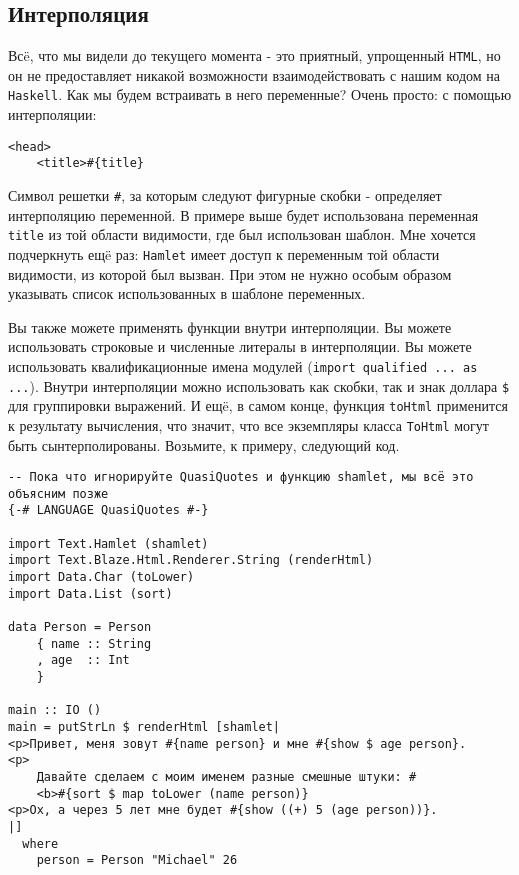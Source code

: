 \subsection{Интерполяция}
Всë, что мы видели до текущего момента - это приятный, упрощенный \texttt{HTML}, но он
не предоставляет никакой возможности взаимодействовать с нашим кодом на \texttt{Haskell}.
Как мы будем встраивать в него переменные? Очень просто: с помощью интерполяции:

\begin{lstlisting}
<head>
    <title>#{title}
\end{lstlisting}

Символ решетки \verb'#', за которым следуют фигурные скобки - определяет интерполяцию
переменной. В примере выше будет использована переменная \lstinline!title! из той
области видимости, где был использован шаблон. Мне хочется подчеркнуть ещë раз:
\texttt{Hamlet} имеет доступ к переменным той области видимости, из которой был вызван.
При этом не нужно особым образом указывать список использованных в шаблоне переменных.

Вы также можете применять функции внутри интерполяции. Вы можете использовать
строковые и численные литералы в интерполяции. Вы можете использовать 
квалификационные имена модулей (\lstinline!import qualified ... as ...!). Внутри
интерполяции можно использовать как скобки, так и знак доллара \texttt{\$}
для группировки выражений. И ещë, в самом конце, функция \lstinline!toHtml!
применится к результату вычисления, что значит, что все экземпляры класса 
\lstinline!ToHtml! могут быть сынтерполированы. Возьмите, к примеру, следующий код.

\begin{lstlisting}
-- Пока что игнорируйте QuasiQuotes и функцию shamlet, мы всë это объясним позже
{-# LANGUAGE QuasiQuotes #-}

import Text.Hamlet (shamlet)
import Text.Blaze.Html.Renderer.String (renderHtml)
import Data.Char (toLower)
import Data.List (sort)

data Person = Person
    { name :: String
    , age  :: Int
    }

main :: IO ()
main = putStrLn $ renderHtml [shamlet|
<p>Привет, меня зовут #{name person} и мне #{show $ age person}.
<p>
    Давайте сделаем с моим именем разные смешные штуки: #
    <b>#{sort $ map toLower (name person)}
<p>Ох, а через 5 лет мне будет #{show ((+) 5 (age person))}.
|]
  where
    person = Person "Michael" 26
\end{lstlisting}

